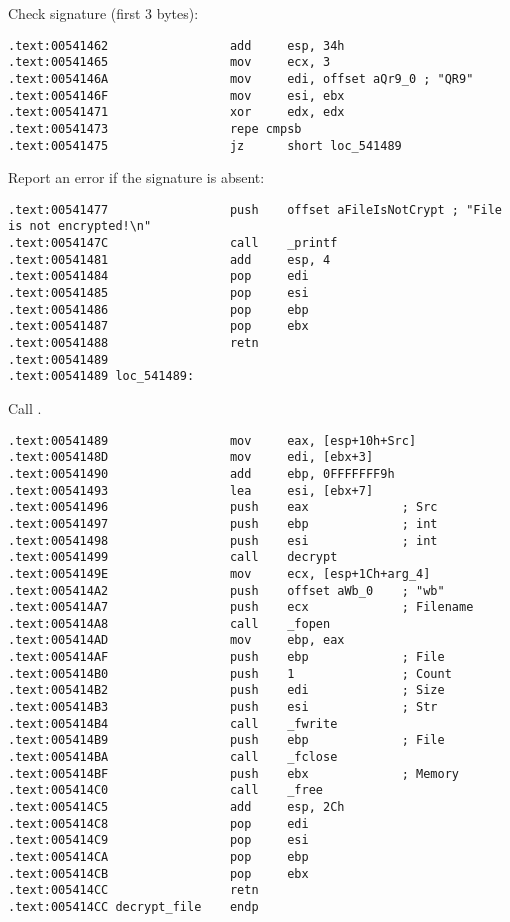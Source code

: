 Check signature (first 3 bytes):

\begin{lstlisting}[style=customasmx86]
.text:00541462                 add     esp, 34h
.text:00541465                 mov     ecx, 3
.text:0054146A                 mov     edi, offset aQr9_0 ; "QR9"
.text:0054146F                 mov     esi, ebx
.text:00541471                 xor     edx, edx
.text:00541473                 repe cmpsb
.text:00541475                 jz      short loc_541489
\end{lstlisting}

Report an error if the signature is absent:

\begin{lstlisting}[style=customasmx86]
.text:00541477                 push    offset aFileIsNotCrypt ; "File is not encrypted!\n"
.text:0054147C                 call    _printf
.text:00541481                 add     esp, 4
.text:00541484                 pop     edi
.text:00541485                 pop     esi
.text:00541486                 pop     ebp
.text:00541487                 pop     ebx
.text:00541488                 retn
.text:00541489
.text:00541489 loc_541489:
\end{lstlisting}

Call .

\begin{lstlisting}[style=customasmx86]
.text:00541489                 mov     eax, [esp+10h+Src]
.text:0054148D                 mov     edi, [ebx+3]
.text:00541490                 add     ebp, 0FFFFFFF9h
.text:00541493                 lea     esi, [ebx+7]
.text:00541496                 push    eax             ; Src
.text:00541497                 push    ebp             ; int
.text:00541498                 push    esi             ; int
.text:00541499                 call    decrypt
.text:0054149E                 mov     ecx, [esp+1Ch+arg_4]
.text:005414A2                 push    offset aWb_0    ; "wb"
.text:005414A7                 push    ecx             ; Filename
.text:005414A8                 call    _fopen
.text:005414AD                 mov     ebp, eax
.text:005414AF                 push    ebp             ; File
.text:005414B0                 push    1               ; Count
.text:005414B2                 push    edi             ; Size
.text:005414B3                 push    esi             ; Str
.text:005414B4                 call    _fwrite
.text:005414B9                 push    ebp             ; File
.text:005414BA                 call    _fclose
.text:005414BF                 push    ebx             ; Memory
.text:005414C0                 call    _free
.text:005414C5                 add     esp, 2Ch
.text:005414C8                 pop     edi
.text:005414C9                 pop     esi
.text:005414CA                 pop     ebp
.text:005414CB                 pop     ebx
.text:005414CC                 retn
.text:005414CC decrypt_file    endp
\end{lstlisting}

